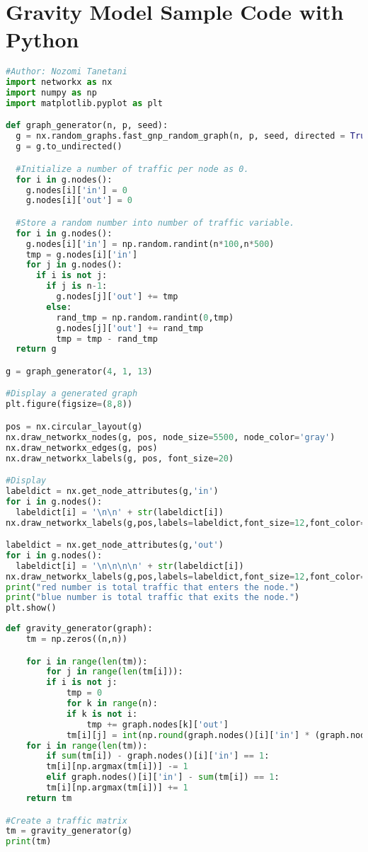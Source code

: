 \section{Gravity Model Sample Code with Python}

\begin{lstlisting}[language=python,caption=Generate Simple Network with Python]
#Author: Nozomi Tanetani
import networkx as nx
import numpy as np
import matplotlib.pyplot as plt 

def graph_generator(n, p, seed):
  g = nx.random_graphs.fast_gnp_random_graph(n, p, seed, directed = True) #Generate a random graph
  g = g.to_undirected()

  #Initialize a number of traffic per node as 0.
  for i in g.nodes():
    g.nodes[i]['in'] = 0
    g.nodes[i]['out'] = 0

  #Store a random number into number of traffic variable.
  for i in g.nodes():
    g.nodes[i]['in'] = np.random.randint(n*100,n*500)
    tmp = g.nodes[i]['in']
    for j in g.nodes():
      if i is not j:
        if j is n-1:
          g.nodes[j]['out'] += tmp
        else:
          rand_tmp = np.random.randint(0,tmp)
          g.nodes[j]['out'] += rand_tmp
          tmp = tmp - rand_tmp
  return g

g = graph_generator(4, 1, 13)

#Display a generated graph
plt.figure(figsize=(8,8))

pos = nx.circular_layout(g)
nx.draw_networkx_nodes(g, pos, node_size=5500, node_color='gray')
nx.draw_networkx_edges(g, pos)
nx.draw_networkx_labels(g, pos, font_size=20)

#Display
labeldict = nx.get_node_attributes(g,'in')
for i in g.nodes():
  labeldict[i] = '\n\n' + str(labeldict[i])
nx.draw_networkx_labels(g,pos,labels=labeldict,font_size=12,font_color='#FFAAAA')

labeldict = nx.get_node_attributes(g,'out')
for i in g.nodes():
  labeldict[i] = '\n\n\n\n' + str(labeldict[i])
nx.draw_networkx_labels(g,pos,labels=labeldict,font_size=12,font_color='#AAFFFF')
print("red number is total traffic that enters the node.")
print("blue number is total traffic that exits the node.")
plt.show()
\end{lstlisting}

\begin{lstlisting}[language=python,caption=Gravity Generator Function with Python]
def gravity_generator(graph):
    tm = np.zeros((n,n))

    for i in range(len(tm)):
        for j in range(len(tm[i])):
        if i is not j:
            tmp = 0
            for k in range(n):
            if k is not i:
                tmp += graph.nodes[k]['out']
            tm[i][j] = int(np.round(graph.nodes()[i]['in'] * (graph.nodes[j]['out'] / tmp))) # Slide Page 15
    for i in range(len(tm)):
        if sum(tm[i]) - graph.nodes()[i]['in'] == 1:
        tm[i][np.argmax(tm[i])] -= 1
        elif graph.nodes()[i]['in'] - sum(tm[i]) == 1:
        tm[i][np.argmax(tm[i])] += 1
    return tm

#Create a traffic matrix
tm = gravity_generator(g)
print(tm)
\end{lstlisting}
